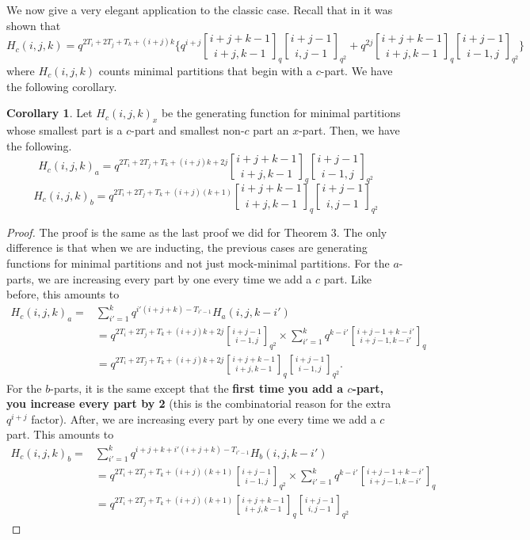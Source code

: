 \documentclass[12pt,a4paper]{amsart}
\theoremstyle{definition}
\theoremstyle{notation}
\theoremstyle{corollary}
\newtheorem{corollary}{Corollary}
\begin{document}
We now give a very elegant application to the classic case.  Recall that in \cite{KAGEABG95} it was shown that \[H_c(i,j,k)=q^{2T_i+2T_j+T_k+(i+j)k}\bigg\{q^{i+j}{i+j+k-1\brack i+j,k-1}_q{i+j-1\brack i,j-1}_{q^2}+q^{2j}{i+j+k-1\brack i+j,k-1}_q{i+j-1\brack i-1,j}_{q^2}\bigg\}\]
where $H_c(i,j,k)$ counts minimal partitions that begin with a $c$-part. We have the following corollary.

\begin{corollary}
Let $H_c(i,j,k)_x$ be the generating function for minimal partitions whose smallest part is a $c$-part and smallest non-$c$ part an $x$-part. Then, we have the following. 
\[H_c(i,j,k)_a=q^{2T_i+2T_j+T_k+(i+j)k+2j}{i+j+k-1\brack i+j,k-1}_q{i+j-1\brack i-1,j}_{q^2}\]
\[H_c(i,j,k)_b=q^{2T_i+2T_j+T_k+(i+j)(k+1)}{i+j+k-1\brack i+j,k-1}_q{i+j-1\brack i,j-1}_{q^2}\]
\end{corollary}
\begin{proof}
The proof is the same as the last proof we did for Theorem 3. The only difference is that when we are inducting, the previous cases are generating functions for minimal partitions and not just mock-minimal partitions. For the $a$-parts, we are increasing every part by one every time we add a $c$ part. Like before, this amounts to 
\begin{align*}
    H_c(i,j,k)_{a}=&\sum_{i'=1}^k q^{i'(i+j+k)-T_{i'-1}}H_{a}(i,j,k-i')\\&=q^{2T_i+2T_j+T_k+(i+j)k+2j}{i+j-1\brack i-1,j}_{q^2}\times \sum_{i'=1}^kq^{k-i'}{i+j-1+k-i'\brack i+j-1,k-i'}_{q}\\
    &=q^{2T_i+2T_j+T_k+(i+j)k+2j}{i+j+k-1\brack i+j,k-1}_q{i+j-1\brack i-1,j}_{q^2}.
\end{align*}
For the $b$-parts, it is the same except that the \textbf{first time you add a $c$-part, you increase every part by 2} (this is the combinatorial reason for the extra $q^{i+j}$ factor). After, we are increasing every part by one every time we add a $c$ part. This amounts to 
\begin{align*}
    H_c(i,j,k)_{b}=& \sum_{i'=1}^k q^{i+j+k+i'(i+j+k)-T_{i'-1}}H_{b}(i,j,k-i')\\&=q^{2T_i+2T_j+T_k+(i+j)(k+1)}{i+j-1\brack i-1,j}_{q^2}\times \sum_{i'=1}^kq^{k-i'}{i+j-1+k-i'\brack i+j-1,k-i'}_{q}\\
    &=q^{2T_i+2T_j+T_k+(i+j)(k+1)}{i+j+k-1\brack i+j,k-1}_q{i+j-1\brack i,j-1}_{q^2}
\end{align*}
\end{proof}
\end{document}

